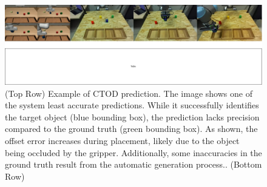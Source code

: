 \begin{figure}[t]
    \centering
    \includegraphics[width=1.0\textwidth]{figures/images/ch5/ctod_cod_prediction.jpg}
    \caption{(Top Row) Example of CTOD prediction. The image shows one of the system least accurate predictions. While it successfully identifies the target object (blue bounding box), the prediction lacks precision compared to the ground truth (green bounding box). As shown, the offset error increases during placement, likely due to the object being occluded by the gripper. Additionally, some inaccuracies in the ground truth result from the automatic generation process.. (Bottom Row) }
    \label{fig:ctod_cod_prediction}
\end{figure}
